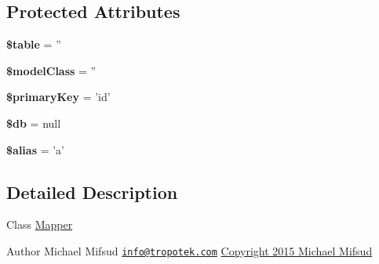 \subsection*{Protected Attributes}
\begin{DoxyCompactItemize}
\item 
\hypertarget{classTk_1_1Db_1_1Mapper_a9d5a5fb5c308451d137951203c6986dc}{{\bfseries \$table} = ''}\label{classTk_1_1Db_1_1Mapper_a9d5a5fb5c308451d137951203c6986dc}

\item 
\hypertarget{classTk_1_1Db_1_1Mapper_a0e9bbd52e7b7af734ca046c9f18c6d62}{{\bfseries \$model\+Class} = ''}\label{classTk_1_1Db_1_1Mapper_a0e9bbd52e7b7af734ca046c9f18c6d62}

\item 
\hypertarget{classTk_1_1Db_1_1Mapper_a4c68a87aa0bf24d98eb3baf39c94b6d4}{{\bfseries \$primary\+Key} = 'id'}\label{classTk_1_1Db_1_1Mapper_a4c68a87aa0bf24d98eb3baf39c94b6d4}

\item 
\hypertarget{classTk_1_1Db_1_1Mapper_ae98b7c0a290337085d327d68fc216e4f}{{\bfseries \$db} = null}\label{classTk_1_1Db_1_1Mapper_ae98b7c0a290337085d327d68fc216e4f}

\item 
\hypertarget{classTk_1_1Db_1_1Mapper_a6a95fdb7ca38ed00c983b9f0bfea439c}{{\bfseries \$alias} = 'a'}\label{classTk_1_1Db_1_1Mapper_a6a95fdb7ca38ed00c983b9f0bfea439c}

\end{DoxyCompactItemize}


\subsection{Detailed Description}
Class \hyperlink{classTk_1_1Db_1_1Mapper}{Mapper}

\begin{DoxyAuthor}{Author}
Michael Mifsud \href{mailto:info@tropotek.com}{\tt info@tropotek.\+com} \hyperlink{}{Copyright 2015 Michael Mifsud }
\end{DoxyAuthor}



